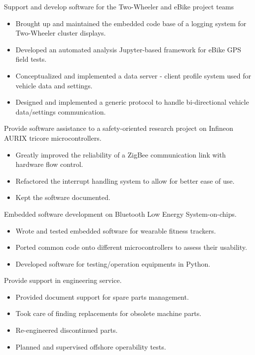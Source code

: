 \documentclass[11pt,a4paper,sans]{moderncv}        %
\begin{document}
{
Support and develop software for the Two-Wheeler and eBike project teams
\begin{itemize}%
    \item Brought up and maintained the embedded code base of a logging system for Two-Wheeler cluster displays. 
    \item Developed an automated analysis Jupyter-based framework for eBike GPS field tests.
    \item Conceptualized and implemented a data server - client profile system used for vehicle data and settings.
    \item Designed and implemented a generic protocol to handle bi-directional vehicle data/settings communication.
\end{itemize}
}

{
Provide software assistance to a safety-oriented research project on Infineon AURIX tricore microcontrollers.
\begin{itemize}%
    \item Greatly improved the reliability of a ZigBee communication link with hardware flow control.
    \item Refactored the interrupt handling system to allow for better ease of use.
    \item Kept the software documented.
\end{itemize}
}

{
Embedded software development on Bluetooth Low Energy System-on-chips.
\begin{itemize}%
    \item Wrote and tested embedded software for wearable fitness trackers.
    \item Ported common code onto different microcontrollers to assess their usability.
    \item Developed software for testing/operation equipments in Python.
\end{itemize}
}

{
Provide support in engineering service.
\begin{itemize}%
    \item Provided document support for spare parts management.
    \item Took care of finding replacements for obsolete machine parts.
    \item Re-engineered discontinued parts.
    \item Planned and supervised offshore operability tests.
\end{itemize}
}
\end{document}
